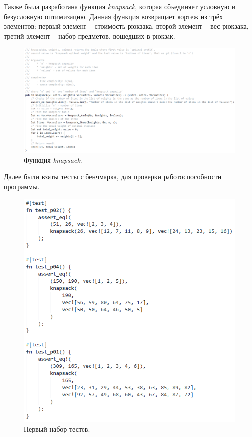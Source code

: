 Также была разработана функция \textit{knapsack}, которая объединяет условную и безусловную оптимизацию. Данная функция возвращает кортеж из трёх элементов: первый элемент -- стоимость рюкзака, второй элемент -- вес рюкзака, третий элемент -- набор предметов, вошедших в рюкзак.
\begin{figure}[h]
  \centering \includegraphics[scale=0.6]{content/images/impl_knapsack7.png}
  \caption{Функция \textit{knapsack}.}
  \label{fig:impl_knapsack7}
\end{figure}

Далее были взяты тесты с бенчмарка, для проверки работоспособности программы.
\begin{figure}[h]
  \centering \includegraphics[scale=0.6]{content/images/impl_knapsack8.png}
  \caption{Первый набор тестов.}
  \label{fig:impl_knapsack8}
\end{figure}

